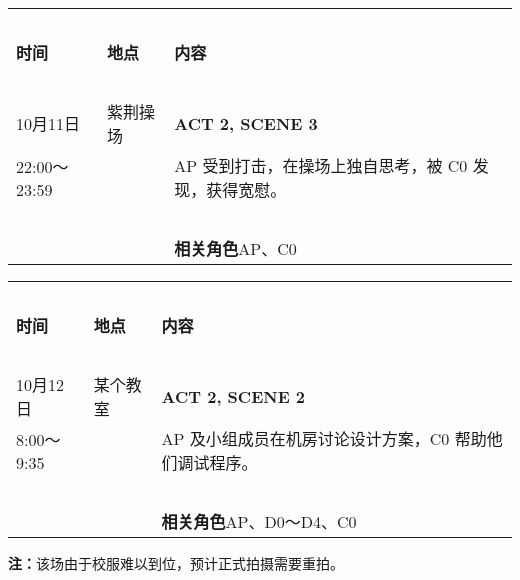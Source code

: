 \documentclass[10pt, a5paper, oneside]{memoir}
\begin{document}
\begin{table}[!ht]
    \raggedright
    \begin{tabular}{p{}p{}p{}}
        \toprule
        ~ & & \\[-0.7em]
        \textbf{时间} & \textbf{地点} & \textbf{内容} \\[0.3em]
        \midrule
        ~ & & \\[-0.7em]
        10月11日        & 紫荆操场 & \textbf{ACT 2, SCENE 3} \\[0.3em]
        22:00～23:59    & ~ & 
            AP 受到打击，在操场上独自思考，被 C0 发现，获得宽慰。
        \\
        ~ & & \\[-0.7em]
        ~ & ~ & \textbf{相关角色\quad}AP、C0 \\[0.3em]
        \bottomrule
    \end{tabular}
\end{table}

\begin{table}[!ht]
    \raggedright
    \begin{tabular}{p{}p{}p{}}
        \toprule
        ~ & & \\[-0.7em]
        \textbf{时间} & \textbf{地点} & \textbf{内容} \\[0.3em]
        \midrule
        ~ & & \\[-0.7em]
        10月12日        & 某个教室 & \textbf{ACT 2, SCENE 2} \\[0.3em]
        8:00～9:35      & ~ & 
            AP 及小组成员在机房讨论设计方案，C0 帮助他们调试程序。
        \\
        ~ & & \\[-0.7em]
        ~ & ~ & \textbf{相关角色\quad}AP、D0～D4、C0 \\[0.3em]
        \bottomrule
    \end{tabular}
\end{table}
{   \vspace{-0.7\baselineskip}
    \kai \small
    \textbf{注：}该场由于校服难以到位，预计正式拍摄需要重拍。
}



\end{document}
